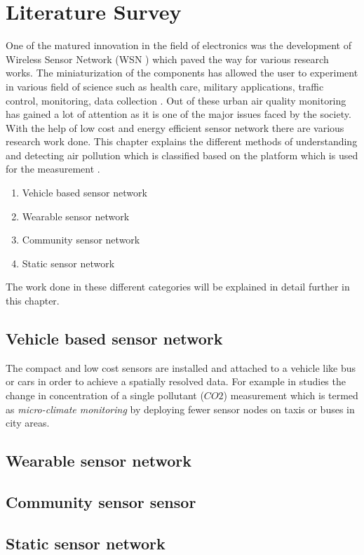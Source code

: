\chapter{Literature Survey}

One of the matured innovation in the field of electronics was the development of Wireless Sensor Network (WSN ) which paved the way for various research works. The miniaturization of the components has allowed the user to experiment in various field of science such as health care, military applications, traffic control, monitoring, data collection \cite{Khedo2017} \cite{Liu2017}. Out of these urban air quality monitoring has gained a lot of attention as it is one of the major issues faced by the society. With the help of low cost and energy efficient sensor network there are various research work done. This chapter explains the different methods of understanding and detecting air pollution which is classified based on the platform which is used for the measurement\cite{Yi2015} \cite{Pavani2017}.
\begin{enumerate}
    \item Vehicle based sensor network
    \item Wearable sensor network
    \item Community sensor network
    \item Static sensor network
 \end{enumerate} 
 The work done in these different categories will be explained in detail further in this chapter.

\section{Vehicle based sensor network}
The compact and low cost sensors are installed and attached to a vehicle like bus or cars in order to achieve a spatially resolved data.  For example in \cite{Hu2011} studies the change in concentration of a single pollutant ($CO2$) measurement which is termed as \textit{micro-climate monitoring} by deploying fewer sensor nodes on taxis or buses in city areas.
\section{Wearable sensor network}
\section{Community sensor sensor}
\section{Static sensor network}